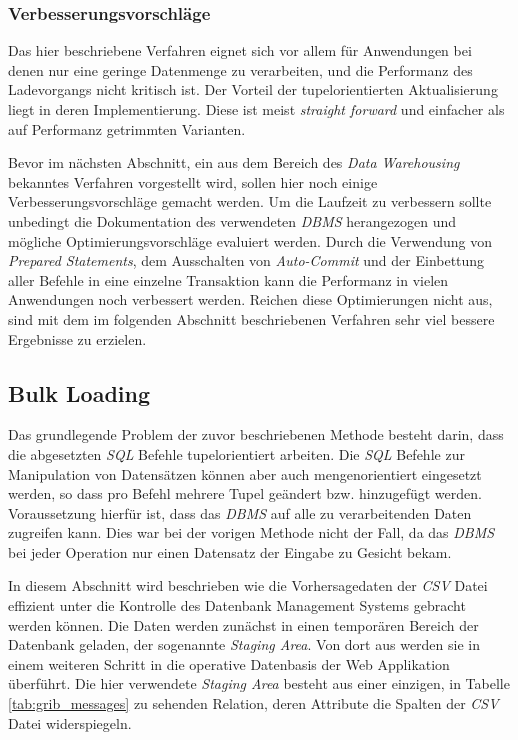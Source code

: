 \subsubsection{Verbesserungsvorschläge}
Das hier beschriebene Verfahren eignet sich vor allem für Anwendungen
bei denen nur eine geringe Datenmenge zu verarbeiten, und die
Performanz des Ladevorgangs nicht kritisch ist. Der Vorteil der
tupelorientierten Aktualisierung liegt in deren Implementierung. Diese
ist meist \textit{straight forward} und einfacher als auf Performanz
getrimmten Varianten.

Bevor im nächsten Abschnitt, ein aus dem Bereich des \textit{Data
  Warehousing} bekanntes Verfahren vorgestellt wird, sollen hier noch
einige Verbesserungsvorschläge gemacht werden. Um die Laufzeit zu
verbessern sollte unbedingt die Dokumentation des verwendeten
\textit{DBMS} herangezogen und mögliche Optimierungsvorschläge
evaluiert werden. Durch die Verwendung von \textit{Prepared
  Statements}, dem Ausschalten von \textit{Auto-Commit} und der
Einbettung aller Befehle in eine einzelne Transaktion kann die
Performanz in vielen Anwendungen noch verbessert werden. Reichen diese
Optimierungen nicht aus, sind mit dem im folgenden Abschnitt
beschriebenen Verfahren sehr viel bessere Ergebnisse zu erzielen.

\subsection{Bulk Loading}

Das grundlegende Problem der zuvor beschriebenen Methode besteht
darin, dass die abgesetzten \textit{SQL} Befehle tupelorientiert
arbeiten. Die \textit{SQL} Befehle zur Manipulation von Datensätzen
können aber auch mengenorientiert eingesetzt werden, so dass pro
Befehl mehrere Tupel geändert bzw. hinzugefügt werden. Voraussetzung
hierfür ist, dass das \textit{DBMS} auf alle zu verarbeitenden Daten
zugreifen kann. Dies war bei der vorigen Methode nicht der Fall, da
das \textit{DBMS} bei jeder Operation nur einen Datensatz der Eingabe
zu Gesicht bekam.

In diesem Abschnitt wird beschrieben wie die Vorhersagedaten der
\textit{CSV} Datei effizient unter die Kontrolle des Datenbank
Management Systems gebracht werden können. Die Daten werden zunächst
in einen temporären Bereich der Datenbank geladen, der sogenannte
\textit{Staging Area}. Von dort aus werden sie in einem weiteren
Schritt in die operative Datenbasis der Web Applikation überführt. Die
hier verwendete \textit{Staging Area} besteht aus einer einzigen, in
Tabelle \ref{tab:grib_messages} zu sehenden Relation, deren Attribute
die Spalten der \textit{CSV} Datei widerspiegeln.

